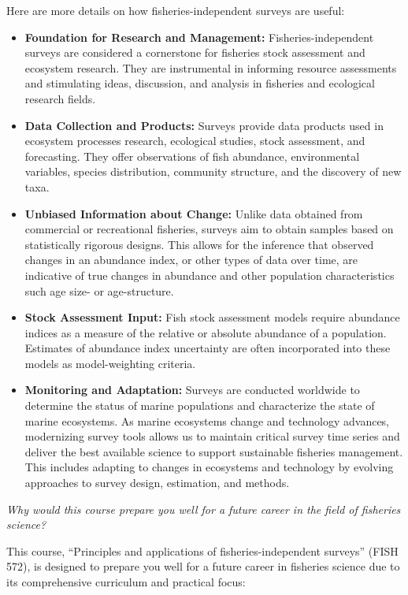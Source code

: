 \documentclass[
  letterpaper,
  oneside,
  open=any]{scrbook}
\providecommand{\tightlist}{%
  \setlength{\itemsep}{0pt}\setlength{\parskip}{0pt}}\usepackage{longtable,booktabs,array}
\begin{document}
Here are more details on how fisheries-independent surveys are useful:

\begin{itemize}
\tightlist
\item
  \textbf{Foundation for Research and Management:} Fisheries-independent
  surveys are considered a cornerstone for fisheries stock assessment
  and ecosystem research. They are instrumental in informing resource
  assessments and stimulating ideas, discussion, and analysis in
  fisheries and ecological research fields.
\item
  \textbf{Data Collection and Products:} Surveys provide data products
  used in ecosystem processes research, ecological studies, stock
  assessment, and forecasting. They offer observations of fish
  abundance, environmental variables, species distribution, community
  structure, and the discovery of new taxa.
\item
  \textbf{Unbiased Information about Change:} Unlike data obtained from
  commercial or recreational fisheries, surveys aim to obtain samples
  based on statistically rigorous designs. This allows for the inference
  that observed changes in an abundance index, or other types of data
  over time, are indicative of true changes in abundance and other
  population characteristics such age size- or age-structure.
\item
  \textbf{Stock Assessment Input:} Fish stock assessment models require
  abundance indices as a measure of the relative or absolute abundance
  of a population. Estimates of abundance index uncertainty are often
  incorporated into these models as model-weighting criteria.
\item
  \textbf{Monitoring and Adaptation:} Surveys are conducted worldwide to
  determine the status of marine populations and characterize the state
  of marine ecosystems. As marine ecosystems change and technology
  advances, modernizing survey tools allows us to maintain critical
  survey time series and deliver the best available science to support
  sustainable fisheries management. This includes adapting to changes in
  ecosystems and technology by evolving approaches to survey design,
  estimation, and methods.
\end{itemize}

\emph{Why would this course prepare you well for a future career in the
field of fisheries science?}

This course, ``Principles and applications of fisheries-independent
surveys'' (FISH 572), is designed to prepare you well for a future
career in fisheries science due to its comprehensive curriculum and
practical focus:
\end{document}
